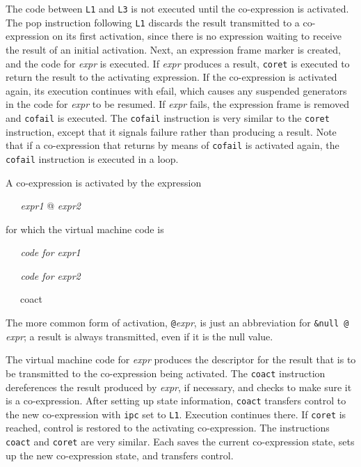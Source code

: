 The code between \texttt{L1} and \texttt{L3} is not executed until the
co-expression is activated. The pop instruction following \texttt{L1}
discards the result transmitted to a co-expression on its first
activation, since there is no expression waiting to receive the result
of an initial activation. Next, an expression frame marker is created,
and the code for \textit{expr} is executed. If
\textit{expr} produces a result, \texttt{coret} is
executed to return the result to the activating expression. If the
co-expression is activated again, its execution continues with efail,
which causes any suspended generators in the code for
\textit{expr} to be resumed. If
\textit{expr} fails, the expression frame is removed
and \texttt{cofail} is executed. The \texttt{cofail} instruction is
very similar to the \texttt{coret} instruction, except that it signals
failure rather than producing a result. Note that if a co-expression
that returns by means of \texttt{cofail} is activated again, the
\texttt{cofail} instruction is executed in a loop.

A co-expression is activated by the expression

{\ttfamily\mdseries
\textit{\ \ \ expr1 }@ \textit{expr2}}

\noindent for which the virtual machine code is

{\itshape
\ \ \ code for expr1}

{\itshape
\ \ \ code for expr2}


\ \ \ coact


The more common form of activation,
\texttt{@}\textit{expr}, is just an abbreviation for
\texttt{\&null @} \textit{expr}; a result is always
transmitted, even if it is the null value.

The virtual machine code for \textit{expr} produces
the descriptor for the result that is to be transmitted to the
co-expression being activated. The \texttt{coact} instruction
dereferences the result produced by \textit{expr}, if
necessary, and checks to make sure it is a co-expression. After
setting up state information, \texttt{coact} transfers control to the
new co-expression with \texttt{ipc} set to \texttt{L1}. Execution
continues there. If \texttt{coret} is reached, control is restored to
the activating co-expression. The instructions \texttt{coact} and
\texttt{coret} are very similar. Each saves the current co-expression
state, sets up the new co-expression state, and transfers control.

